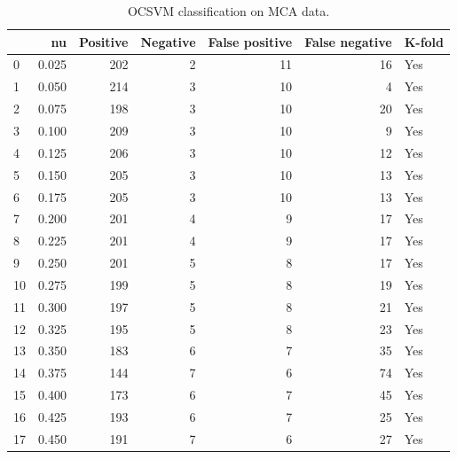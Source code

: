 \documentclass[a4paper,twoside,12pt]{book}
\begin{document}
\begin{appendices}
\begin{table}
	\centering
	\caption{OCSVM classification on MCA data.}
	\label{id:tab:OCSVMonMCA}
	\begin{tabular}{lrrrrrl}
		\toprule
		{} &     nu &  Positive &  Negative &  False positive &  False negative & K-fold \\
		\midrule
		0  &  0.025 &       202 &         2 &              11 &              16 &    Yes \\
		1  &  0.050 &       214 &         3 &              10 &               4 &    Yes \\
		2  &  0.075 &       198 &         3 &              10 &              20 &    Yes \\
		3  &  0.100 &       209 &         3 &              10 &               9 &    Yes \\
		4  &  0.125 &       206 &         3 &              10 &              12 &    Yes \\
		5  &  0.150 &       205 &         3 &              10 &              13 &    Yes \\
		6  &  0.175 &       205 &         3 &              10 &              13 &    Yes \\
		7  &  0.200 &       201 &         4 &               9 &              17 &    Yes \\
		8  &  0.225 &       201 &         4 &               9 &              17 &    Yes \\
		9  &  0.250 &       201 &         5 &               8 &              17 &    Yes \\
		10 &  0.275 &       199 &         5 &               8 &              19 &    Yes \\
		11 &  0.300 &       197 &         5 &               8 &              21 &    Yes \\
		12 &  0.325 &       195 &         5 &               8 &              23 &    Yes \\
		13 &  0.350 &       183 &         6 &               7 &              35 &    Yes \\
		14 &  0.375 &       144 &         7 &               6 &              74 &    Yes \\
		15 &  0.400 &       173 &         6 &               7 &              45 &    Yes \\
		16 &  0.425 &       193 &         6 &               7 &              25 &    Yes \\
		17 &  0.450 &       191 &         7 &               6 &              27 &    Yes \\

\end{tabular}
\end{table}
\end{appendices}
\end{document}

